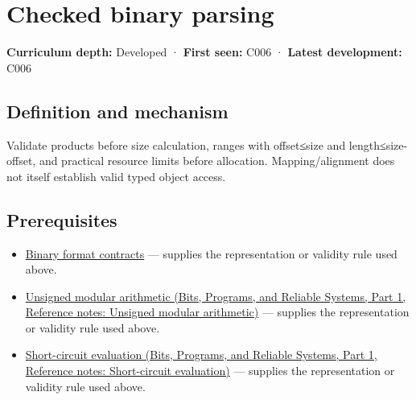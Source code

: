 \hypertarget{appendix-652d81568de9}{}\label{referencestart:appendix-652d81568de9}
\section{Checked binary parsing}\label{appendix-652d81568de9-checked-binary-parsing}

\hypertarget{appendix-652d81568de9-checked-binary-parsing}{}

\textbf{Curriculum depth:} Developed · \textbf{First seen:} C006 · \textbf{Latest development:} C006

\begin{allmightroledefinition}

\subsection{Definition and mechanism}\label{appendix-652d81568de9-definition-and-mechanism}

\hypertarget{appendix-652d81568de9-definition-and-mechanism}{}

Validate products before size calculation, ranges with offset≤size and length≤size-offset, and practical resource limits before allocation. Mapping/alignment does not itself establish valid typed object access.

\end{allmightroledefinition}

\subsection{Prerequisites}\label{appendix-652d81568de9-prerequisites}

\hypertarget{appendix-652d81568de9-prerequisites}{}

\begin{itemize}
\tightlist
\item
  \hyperref[appendix-590bbb2424c1]{Binary format contracts} --- supplies the representation or validity rule used above.
\item
  \href{../01-Bits-Programs-and-Reliable-Systems-P01/main.pdf\#appendix-c99977d88b33}{Unsigned modular arithmetic (Bits, Programs, and Reliable Systems, Part 1, Reference notes: Unsigned modular arithmetic)} --- supplies the representation or validity rule used above.
\item
  \href{../01-Bits-Programs-and-Reliable-Systems-P01/main.pdf\#appendix-2e245a6fa8d3}{Short-circuit evaluation (Bits, Programs, and Reliable Systems, Part 1, Reference notes: Short-circuit evaluation)} --- supplies the representation or validity rule used above.
\end{itemize}

